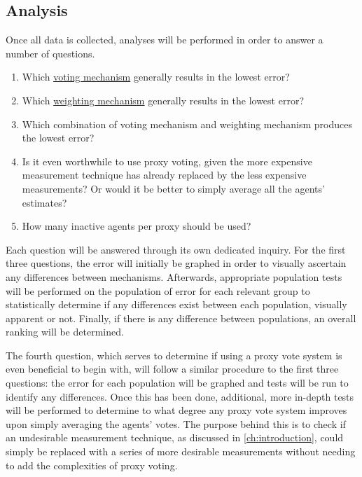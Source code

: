 \subsection{Analysis}\label{subsec:analysis}
Once all data is collected, analyses will be performed in order to answer a
number of questions.
\begin{enumerate}[label=\textbf{Q\arabic*}., leftmargin=2\parindent]
    \item Which \hyperref[subsec:voting-mechanisms]{voting mechanism}
    generally results in the lowest error?

    \item Which \hyperref[subsec:weighting-mechanisms]{weighting mechanism}
    generally results in the lowest error?

    \item Which combination of voting mechanism and weighting mechanism
    produces the lowest error?

    \item Is it even worthwhile to use proxy voting, given the more expensive
    measurement technique has already replaced by the less expensive measurements?
    Or would it be better to simply average all the agents' estimates?

    \item How many inactive agents per proxy should be used?
\end{enumerate}

Each question will be answered through its own dedicated inquiry.
For the first three questions, the error will initially be graphed in order to
visually ascertain any differences between mechanisms.
Afterwards, appropriate population tests will be performed on the population of error
for each relevant group to statistically determine if any differences exist between
each population, visually apparent or not.
Finally, if there is any difference between populations, an overall ranking will be
determined.

The fourth question, which serves to determine if using a proxy vote system is even
beneficial to begin with, will follow a similar procedure to the first three
questions: the error for each population will be graphed and tests will be run to
identify any differences.
Once this has been done, additional, more in-depth tests will be performed to
determine to what degree any proxy vote system improves upon simply averaging the
agents' votes.
The purpose behind this is to check if an undesirable measurement technique, as
discussed in \autoref{ch:introduction}, could simply be replaced with a series of
more desirable measurements without needing to add the complexities of proxy voting.

